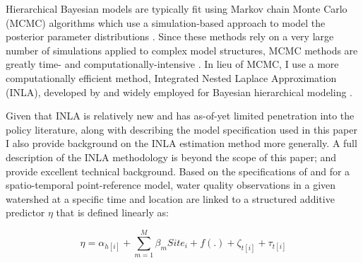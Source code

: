\documentclass[12pt,a4paper,titlepage]{article}
\begin{document}
Hierarchical Bayesian models are typically fit using Markov chain Monte Carlo (MCMC) algorithms which use a simulation-based approach to model the posterior parameter distributions \parencite{brooks2011,robert2004,lesage2010}. Since these methods rely on a very large number of simulations applied to complex model structures, MCMC methods are greatly time- and computationally-intensive \parencite{blangiardo2013}. In lieu of MCMC, I use a more computationally efficient method, Integrated Nested Laplace Approximation (INLA), developed by \textcite{rue2009} and widely employed for Bayesian hierarchical modeling \parencite{beguin2012,martino2011,martino2010,lindgren2011,cosandey-godin2014}.

Given that INLA is relatively new and has as-of-yet limited penetration into the policy literature, along with describing the model specification used in this paper I also provide background on the INLA estimation method more generally. A full description of the INLA methodology is beyond the scope of this paper; \textcite{rue2014} and \textcite{lindgren2013} provide excellent technical background. Based on the specifications of \textcite{cameletti2013}and \textcite{cosandey-godin2014} for a spatio-temporal point-reference model, water quality observations in a given watershed at a specific time and location are linked to a structured additive predictor $\eta$ that is defined linearly as:

\begin{equation}
\eta = \alpha_{h[i]} + \sum_{m=1}^{M} \beta_{m}Site_{i} + f(.) + \zeta_{t[i]} + \tau_{t[i]}
\label{eq:obslevel}
\end{equation}
\end{document}
